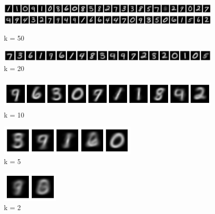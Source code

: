 \documentclass{article}
\begin{document}
\begin{figure}[H]
    \centering
    \includegraphics[width=1\textwidth]{figure/outputk50a.png} 
    \includegraphics[width=1\textwidth]{figure/outputk50b.png} 
    \vspace{-25pt} 
    \caption{k = 50}
\end{figure}
\vspace{-10pt} 
\begin{figure}[H]
    \centering
    \includegraphics[width=1\textwidth]{figure/outputk20.png} 
    \vspace{-25pt} 
    \caption{k = 20}
\end{figure}
\vspace{-10pt} 
\begin{figure}[H]
    \centering
    \includegraphics[height=1.5cm]{figure/outputk10.png} 
    \vspace{-15pt} 
    \caption{k = 10}
\end{figure}
\vspace{-10pt} 
\begin{figure}[H]
    \centering
    \includegraphics[height=1.5cm]{figure/outputk5.png} 
    \vspace{-15pt} 
    \caption{k = 5}
\end{figure}
\vspace{-10pt} 
\begin{figure}[H]
    \centering
    \includegraphics[height=1.5cm]{figure/outputk2.png} 
    \vspace{-15pt} 
    \caption{k = 2}
\end{figure}
\end{document}
